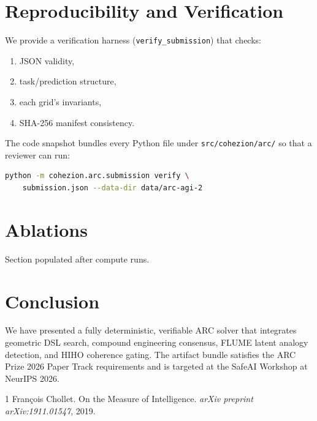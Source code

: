 \documentclass[11pt,a4paper]{article}
\begin{document}
\section{Reproducibility and Verification}
We provide a verification harness (\texttt{verify\_submission}) that checks:
\begin{enumerate}
    \item JSON validity,
    \item task/prediction structure,
    \item each grid's invariants,
    \item SHA-256 manifest consistency.
\end{enumerate}
The code snapshot bundles every Python file under \texttt{src/cohezion/arc/} so that a reviewer can run:
\begin{lstlisting}[language=bash]
python -m cohezion.arc.submission verify \
    submission.json --data-dir data/arc-agi-2
\end{lstlisting}

\section{Ablations}
Section populated after compute runs.

\section{Conclusion}
We have presented a fully deterministic, verifiable ARC solver that integrates geometric DSL search, compound engineering consensus, FLUME latent analogy detection, and HIHO coherence gating. The artifact bundle satisfies the ARC Prize 2026 Paper Track requirements and is targeted at the SafeAI Workshop at NeurIPS 2026.


\begin{thebibliography}{1}
Fran\c{c}ois Chollet.
\newblock On the Measure of Intelligence.
\newblock \emph{arXiv preprint arXiv:1911.01547}, 2019.
\end{thebibliography}
\end{document}
